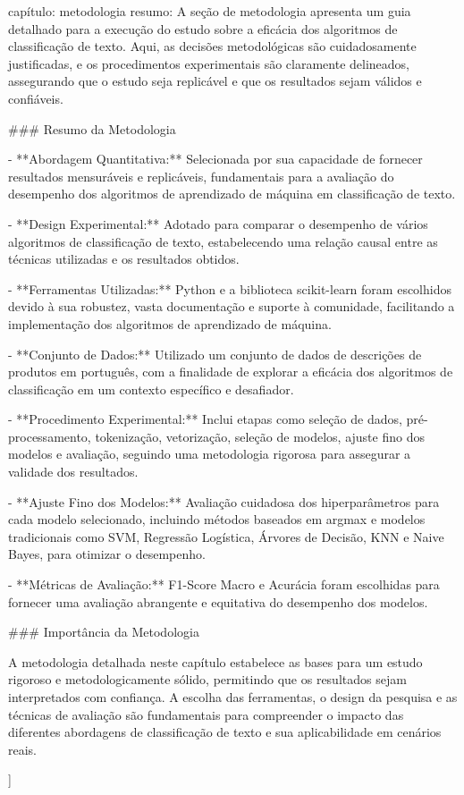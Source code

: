 {
capítulo: metodologia
resumo: A seção de metodologia apresenta um guia detalhado para a execução do estudo sobre a eficácia dos algoritmos de classificação de texto. Aqui, as decisões metodológicas são cuidadosamente justificadas, e os procedimentos experimentais são claramente delineados, assegurando que o estudo seja replicável e que os resultados sejam válidos e confiáveis.

### Resumo da Metodologia

- **Abordagem Quantitativa:** Selecionada por sua capacidade de fornecer resultados mensuráveis e replicáveis, fundamentais para a avaliação do desempenho dos algoritmos de aprendizado de máquina em classificação de texto.

- **Design Experimental:** Adotado para comparar o desempenho de vários algoritmos de classificação de texto, estabelecendo uma relação causal entre as técnicas utilizadas e os resultados obtidos.

- **Ferramentas Utilizadas:** Python e a biblioteca scikit-learn foram escolhidos devido à sua robustez, vasta documentação e suporte à comunidade, facilitando a implementação dos algoritmos de aprendizado de máquina.

- **Conjunto de Dados:** Utilizado um conjunto de dados de descrições de produtos em português, com a finalidade de explorar a eficácia dos algoritmos de classificação em um contexto específico e desafiador.

- **Procedimento Experimental:** Inclui etapas como seleção de dados, pré-processamento, tokenização, vetorização, seleção de modelos, ajuste fino dos modelos e avaliação, seguindo uma metodologia rigorosa para assegurar a validade dos resultados.

- **Ajuste Fino dos Modelos:** Avaliação cuidadosa dos hiperparâmetros para cada modelo selecionado, incluindo métodos baseados em argmax e modelos tradicionais como SVM, Regressão Logística, Árvores de Decisão, KNN e Naive Bayes, para otimizar o desempenho.

- **Métricas de Avaliação:** F1-Score Macro e Acurácia foram escolhidas para fornecer uma avaliação abrangente e equitativa do desempenho dos modelos.

### Importância da Metodologia

A metodologia detalhada neste capítulo estabelece as bases para um estudo rigoroso e metodologicamente sólido, permitindo que os resultados sejam interpretados com confiança. A escolha das ferramentas, o design da pesquisa e as técnicas de avaliação são fundamentais para compreender o impacto das diferentes abordagens de classificação de texto e sua aplicabilidade em cenários reais.



}
]